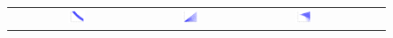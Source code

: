 \documentclass{article} %
\newcommand{\nn}{0.16}
\begin{document}
\begin{figure}[t!]
\begin{center}
\begin{tabular}{cccccc}
& \hspace{-3mm} \includegraphics[width=\nn\textwidth]{Figs/col_m1v1_when_p_is_3_and_v2_is_0_dot_2.png}
& \hspace{-3mm} \includegraphics[width=\nn\textwidth]{Figs/col_v1v2.png}
& \hspace{-3mm} \includegraphics[width=\nn\textwidth]{Figs/col_v1v2whenPis3.png}

\end{tabular}
\end{center}
\end{figure}
\end{document}
